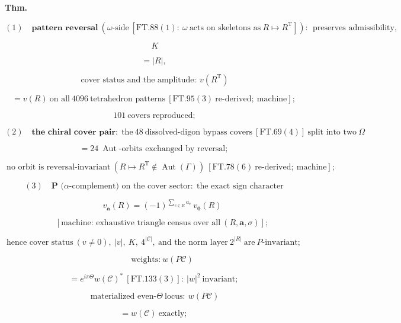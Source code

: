 \begin{theorem}\label{tag:FT-137}
\textbf{Thm.}

\[
(1)\quad\textbf{pattern reversal}\ (\omega\text{-side}\ [\mathrm{FT.88}(1):\ \omega\ \text{acts on skeletons as}\ R\mapsto R^{\mathrm T}]):\ \ \text{preserves admissibility},
\]

\[
\ K
\]

\[
= |R|,
\]

\[
\ \text{cover status and the amplitude}:\ v(R^{\mathrm T})
\]

\[
= v(R)\ \text{on all}\ 4096\ \text{tetrahedron patterns}\ [\mathrm{FT.95}(3)\ \text{re-derived};\ \text{machine}];
\]

\[
\ 101\ \text{covers reproduced};
\]

\[
(2)\quad\textbf{the chiral cover pair:}\ \ \text{the}\ 48\ \text{dissolved-digon bypass covers}\ [\mathrm{FT.69}(4)]\ \text{split into two}\ \Omega
\]

\[
= 24\ \operatorname{Aut}\text{-orbits exchanged by reversal};
\]

\[
\ \text{no orbit is reversal-invariant}\ (R\mapsto R^{\mathrm T}\notin\operatorname{Aut}(\Gamma))\ [\mathrm{FT.78}(6)\ \text{re-derived};\ \text{machine}];
\]

\[
(3)\quad\textbf{P (}\alpha\text{-complement) on the cover sector:}\ \ \text{the exact sign character}
\]

\[
\qquad v_{\mathbf a}(R)=(-1)^{\sum_{e\in R}a_e}\,v_{\mathbf 0}(R)
\]

\[
\qquad [\text{machine: exhaustive triangle census over all}\ (R,\mathbf a,\sigma)];
\]

\[
\text{hence cover status}\ (v\ne0),\ |v|,\ K,\ 4^{|\mathcal C|},\ \text{and the norm layer}\ 2^{|R|}\ \text{are}\ P\text{-invariant};
\]

\[
\qquad \text{weights:}\ w(P\mathcal C)
\]

\[
= e^{i\pi\Theta}w(\mathcal C)^{*}\ [\mathrm{FT.133}(3)]:\ |w|^2\ \text{invariant};
\]

\[
\ \text{materialized even-}\Theta\ \text{locus}:\ w(P\mathcal C)
\]

\[
= w(\mathcal C)\ \text{exactly};
\]


\end{theorem}
